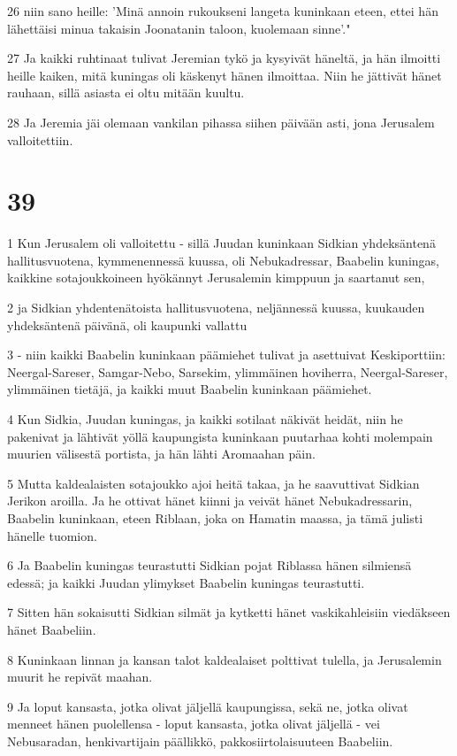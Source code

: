 \par 26 niin sano heille: 'Minä annoin rukoukseni langeta kuninkaan eteen, ettei hän lähettäisi minua takaisin Joonatanin taloon, kuolemaan sinne'."
\par 27 Ja kaikki ruhtinaat tulivat Jeremian tykö ja kysyivät häneltä, ja hän ilmoitti heille kaiken, mitä kuningas oli käskenyt hänen ilmoittaa. Niin he jättivät hänet rauhaan, sillä asiasta ei oltu mitään kuultu.
\par 28 Ja Jeremia jäi olemaan vankilan pihassa siihen päivään asti, jona Jerusalem valloitettiin.

\chapter{39}

\par 1 Kun Jerusalem oli valloitettu - sillä Juudan kuninkaan Sidkian yhdeksäntenä hallitusvuotena, kymmenennessä kuussa, oli Nebukadressar, Baabelin kuningas, kaikkine sotajoukkoineen hyökännyt Jerusalemin kimppuun ja saartanut sen,
\par 2 ja Sidkian yhdentenätoista hallitusvuotena, neljännessä kuussa, kuukauden yhdeksäntenä päivänä, oli kaupunki vallattu
\par 3 - niin kaikki Baabelin kuninkaan päämiehet tulivat ja asettuivat Keskiporttiin: Neergal-Sareser, Samgar-Nebo, Sarsekim, ylimmäinen hoviherra, Neergal-Sareser, ylimmäinen tietäjä, ja kaikki muut Baabelin kuninkaan päämiehet.
\par 4 Kun Sidkia, Juudan kuningas, ja kaikki sotilaat näkivät heidät, niin he pakenivat ja lähtivät yöllä kaupungista kuninkaan puutarhaa kohti molempain muurien välisestä portista, ja hän lähti Aromaahan päin.
\par 5 Mutta kaldealaisten sotajoukko ajoi heitä takaa, ja he saavuttivat Sidkian Jerikon aroilla. Ja he ottivat hänet kiinni ja veivät hänet Nebukadressarin, Baabelin kuninkaan, eteen Riblaan, joka on Hamatin maassa, ja tämä julisti hänelle tuomion.
\par 6 Ja Baabelin kuningas teurastutti Sidkian pojat Riblassa hänen silmiensä edessä; ja kaikki Juudan ylimykset Baabelin kuningas teurastutti.
\par 7 Sitten hän sokaisutti Sidkian silmät ja kytketti hänet vaskikahleisiin viedäkseen hänet Baabeliin.
\par 8 Kuninkaan linnan ja kansan talot kaldealaiset polttivat tulella, ja Jerusalemin muurit he repivät maahan.
\par 9 Ja loput kansasta, jotka olivat jäljellä kaupungissa, sekä ne, jotka olivat menneet hänen puolellensa - loput kansasta, jotka olivat jäljellä - vei Nebusaradan, henkivartijain päällikkö, pakkosiirtolaisuuteen Baabeliin.
